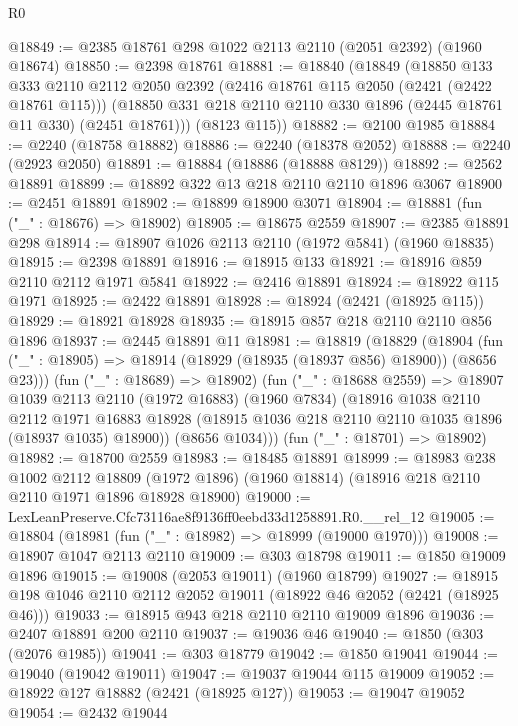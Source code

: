 \begin{lexlean}{R0}
\begin{coremodule}
@18849 := @2385 @18761 @298 @1022 @2113 @2110 (@2051 @2392) (@1960 @18674)
@18850 := @2398 @18761
@18881 := @18840
    (@18849
      (@18850
        @133
        @333
        @2110
        @2112
        @2050
        @2392
        (@2416 @18761 @115 @2050 (@2421 (@2422 @18761 @115)))
        (@18850 @331 @218 @2110 @2110 @330 @1896 (@2445 @18761 @11 @330) (@2451 @18761)))
      (@8123 @115))
@18882 := @2100 @1985
@18884 := @2240 (@18758 @18882)
@18886 := @2240 (@18378 @2052)
@18888 := @2240 (@2923 @2050)
@18891 := @18884 (@18886 (@18888 @8129))
@18892 := @2562 @18891
@18899 := @18892 @322 @13 @218 @2110 @2110 @1896 @3067
@18900 := @2451 @18891
@18902 := @18899 @18900 @3071
@18904 := @18881 (fun ("_" : @18676) => @18902)
@18905 := @18675 @2559
@18907 := @2385 @18891 @298
@18914 := @18907 @1026 @2113 @2110 (@1972 @5841) (@1960 @18835)
@18915 := @2398 @18891
@18916 := @18915 @133
@18921 := @18916 @859 @2110 @2112 @1971 @5841
@18922 := @2416 @18891
@18924 := @18922 @115 @1971
@18925 := @2422 @18891
@18928 := @18924 (@2421 (@18925 @115))
@18929 := @18921 @18928
@18935 := @18915 @857 @218 @2110 @2110 @856 @1896
@18937 := @2445 @18891 @11
@18981 := @18819
    (@18829
      (@18904 (fun ("_" : @18905) => @18914 (@18929 (@18935 (@18937 @856) @18900)) (@8656 @23)))
      (fun ("_" : @18689) => @18902)
      (fun ("_" : @18688 @2559) =>
      @18907
        @1039
        @2113
        @2110
        (@1972 @16883)
        (@1960 @7834)
        (@18916
          @1038
          @2110
          @2112
          @1971
          @16883
          @18928
          (@18915 @1036 @218 @2110 @2110 @1035 @1896 (@18937 @1035) @18900))
        (@8656 @1034)))
    (fun ("_" : @18701) => @18902)
@18982 := @18700 @2559
@18983 := @18485 @18891
@18999 := @18983
    @238
    @1002
    @2112
    @18809
    (@1972 @1896)
    (@1960 @18814)
    (@18916 @218 @2110 @2110 @1971 @1896 @18928 @18900)
@19000 := LexLeanPreserve.Cfc73116ae8f9136ff0eebd33d1258891.R0.__rel_12
@19005 := @18804 (@18981 (fun ("_" : @18982) => @18999 (@19000 @1970)))
@19008 := @18907 @1047 @2113 @2110
@19009 := @303 @18798
@19011 := @1850 @19009 @1896
@19015 := @19008 (@2053 @19011) (@1960 @18799)
@19027 := @18915 @198 @1046 @2110 @2112 @2052 @19011 (@18922 @46 @2052 (@2421 (@18925 @46)))
@19033 := @18915 @943 @218 @2110 @2110 @19009 @1896
@19036 := @2407 @18891 @200 @2110
@19037 := @19036 @46
@19040 := @1850 (@303 (@2076 @1985))
@19041 := @303 @18779
@19042 := @1850 @19041
@19044 := @19040 (@19042 @19011)
@19047 := @19037 @19044 @115 @19009
@19052 := @18922 @127 @18882 (@2421 (@18925 @127))
@19053 := @19047 @19052
@19054 := @2432 @19044

\end{coremodule}
\end{lexlean}
